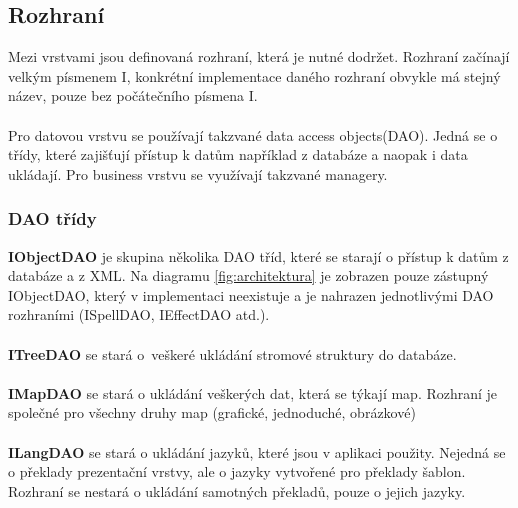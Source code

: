 \documentclass[thesis=B,czech]{resources/FITthesis}[2012/06/26]
\begin{document}
\subsection{Rozhraní}
Mezi vrstvami jsou definovaná rozhraní, která je nutné dodržet. Rozhraní začínají velkým písmenem I, konkrétní implementace daného rozhraní obvykle má stejný název, pouze bez počátečního písmena I.\\
\\
Pro datovou vrstvu se používají takzvané \clqq data access objects\crqq (DAO). Jedná se o třídy, které zajišťují přístup k datům například z databáze a naopak i data ukládají. Pro business vrstvu se využívají takzvané \clqq managery\crqq .
\subsubsection*{DAO třídy}
\noindent\textbf{IObjectDAO} je skupina několika DAO tříd, které se starají o přístup k datům z databáze a z XML. Na diagramu \ref{fig:architektura} je zobrazen pouze zástupný IObjectDAO, který v implementaci neexistuje a je nahrazen jednotlivými DAO rozhraními (ISpellDAO, IEffectDAO atd.).\\
\\
\textbf{ITreeDAO} se stará o~veškeré ukládání stromové struktury do databáze. \\
\\
\textbf{IMapDAO} se stará o ukládání veškerých dat, která se týkají map. Rozhraní je společné pro všechny druhy map (grafické, jednoduché, obrázkové)\\
\\
\textbf{ILangDAO} se stará o ukládání jazyků, které jsou v aplikaci použity. Nejedná se o překlady prezentační vrstvy, ale o jazyky vytvořené pro překlady šablon. Rozhraní se nestará o ukládání samotných překladů, pouze o jejich jazyky.
\end{document}
